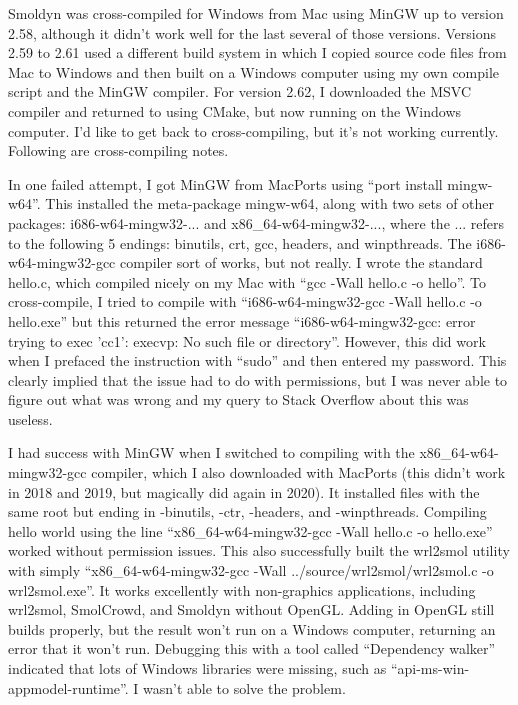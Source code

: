 \documentclass {scrbook}
\begin{document}
Smoldyn was cross-compiled for Windows from Mac using MinGW up to version 2.58, although it didn't work well for the last several of those versions. Versions 2.59 to 2.61 used a different build system in which I copied source code files from Mac to Windows and then built on a Windows computer using my own compile script and the MinGW compiler. For version 2.62, I downloaded the MSVC compiler and returned to using CMake, but now running on the Windows computer. I'd like to get back to cross-compiling, but it's not working currently. Following are cross-compiling notes.

In one failed attempt, I got MinGW from MacPorts using ``port install mingw-w64''. This installed the meta-package mingw-w64, along with two sets of other packages: i686-w64-mingw32-... and x86\_64-w64-mingw32-..., where the ... refers to the following 5 endings: binutils, crt, gcc, headers, and winpthreads. The i686-w64-mingw32-gcc compiler sort of works, but not really. I wrote the standard hello.c, which compiled nicely on my Mac with ``gcc -Wall hello.c -o hello''. To cross-compile, I tried to compile with ``i686-w64-mingw32-gcc -Wall hello.c -o hello.exe'' but this returned the error message ``i686-w64-mingw32-gcc: error trying to exec 'cc1': execvp: No such file or directory''. However, this did work when I prefaced the instruction with ``sudo'' and then entered my password. This clearly implied that the issue had to do with permissions, but I was never able to figure out what was wrong and my query to Stack Overflow about this was useless.

I had success with MinGW when I switched to compiling with the x86\_64-w64-mingw32-gcc compiler, which I also downloaded with MacPorts (this didn't work in 2018 and 2019, but magically did again in 2020). It installed files with the same root but ending in -binutils, -ctr, -headers, and -winpthreads. Compiling hello world using the line ``x86\_64-w64-mingw32-gcc -Wall hello.c -o hello.exe'' worked without permission issues. This also successfully built the wrl2smol utility with simply ``x86\_64-w64-mingw32-gcc -Wall ../source/wrl2smol/wrl2smol.c -o wrl2smol.exe''. It works excellently with non-graphics applications, including wrl2smol, SmolCrowd, and Smoldyn without OpenGL. Adding in OpenGL still builds properly, but the result won't run on a Windows computer, returning an error that it won't run. Debugging this with a tool called ``Dependency walker'' indicated that lots of Windows libraries were missing, such as ``api-ms-win-appmodel-runtime''. I wasn't able to solve the problem.
\end{document}
